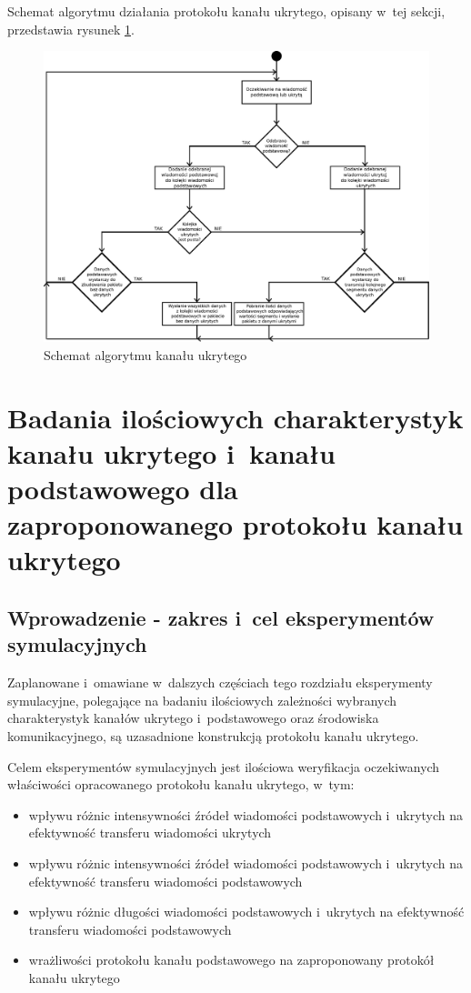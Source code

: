 \documentclass[a4paper, twoside, 12pt]{report}
\begin{document}
    Schemat algorytmu działania protokołu kanału ukrytego, opisany w~tej sekcji,
    przedstawia rysunek \ref{CHANNELALGORITHM}.

        \begin{figure}[h]
                \centering
                \includegraphics[scale=0.60, angle=90]{algorytm_kanalu_ukrytego}
                \caption{Schemat algorytmu kanału ukrytego}
                \label{CHANNELALGORITHM}
        \end{figure}

\chapter{Badania ilościowych charakterystyk kanału ukrytego i~kanału podstawowego dla zaproponowanego protokołu kanału ukrytego}
    \section{Wprowadzenie - zakres i~cel eksperymentów symulacyjnych}
    Zaplanowane i~omawiane w~dalszych częściach tego rozdziału eksperymenty symulacyjne,
    polegające na badaniu ilościowych zależności wybranych charakterystyk kanałów
    ukrytego i~podstawowego oraz środowiska komunikacyjnego, są uzasadnione konstrukcją
    protokołu kanału ukrytego.

    Celem eksperymentów symulacyjnych jest ilościowa weryfikacja oczekiwanych właściwości
    opracowanego protokołu kanału ukrytego, w~tym:
    \begin{itemize} \itemsep1pt \parskip0pt 
        \item wpływu różnic intensywności źródeł wiadomości podstawowych i~ukrytych na
            efektywność transferu wiadomości ukrytych
        \item wpływu różnic intensywności źródeł wiadomości podstawowych i~ukrytych na
            efektywność transferu wiadomości podstawowych
        \item wpływu różnic długości wiadomości podstawowych i~ukrytych na efektywność
            transferu wiadomości podstawowych
        \item wrażliwości protokołu kanału podstawowego na zaproponowany protokół
            kanału ukrytego
    \end{itemize}
\end{document}
